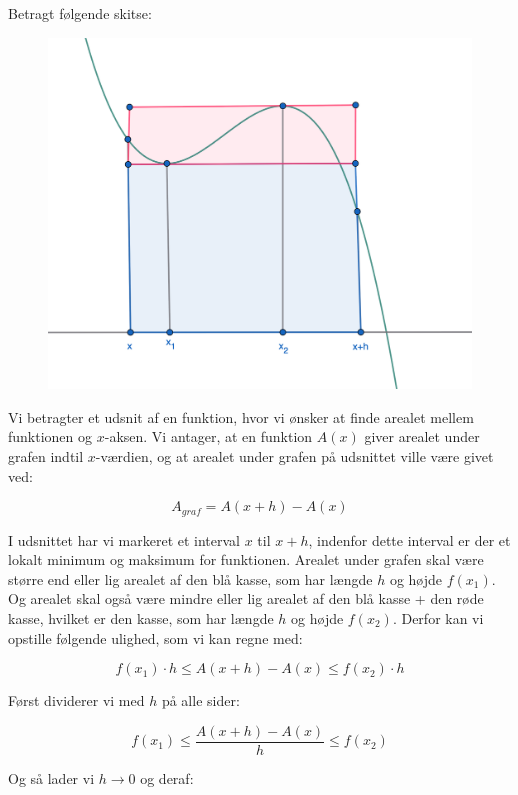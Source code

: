 \documentclass{article}
\makeatletter
\newenvironment{proofw}{\par
  \pushQED{\qed}%
  \normalfont \topsep6\p@\@plus6\p@\relax
  \trivlist
  \item[]\ignorespaces
}{%
  \popQED\endtrivlist\@endpefalse
}
\makeatother
\begin{document}
\begin{proofw}
    
Betragt følgende skitse:

\begin{figure}[h]
    \centering
    \includegraphics[scale=0.3]{skitser/areal_funktion.png}
\end{figure}

Vi betragter et udsnit af en funktion,
hvor vi ønsker at finde arealet mellem funktionen og $x$-aksen.
Vi antager, at en funktion $A(x)$ giver arealet under grafen indtil $x$-værdien,
og at arealet under grafen på udsnittet ville være givet ved:

$$
    A_{graf}=A(x+h)-A(x)
$$

I udsnittet har vi markeret et interval $x$ til $x+h$,
indenfor dette interval er der et lokalt minimum og maksimum for funktionen.
Arealet under grafen skal være større end eller lig arealet af den blå kasse,
som har længde $h$ og højde $f(x_1)$.
Og arealet skal også være mindre eller lig
arealet af den blå kasse + den røde kasse,
hvilket er den kasse, som har længde $h$ og højde $f(x_2)$.
Derfor kan vi opstille følgende ulighed, som vi kan regne med:

$$
    f(x_1) \cdot h \leq A(x+h)-A(x)
    \leq f(x_2) \cdot h
$$

Først dividerer vi med $h$ på alle sider:

$$
    f(x_1) \leq \frac{A(x+h)-A(x)}{h} \leq f(x_2)
$$

Og så lader vi $h \rightarrow 0$ og deraf:


\end{proofw}
\end{document}
